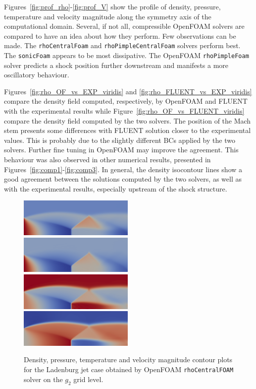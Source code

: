 \documentclass[12pt]{article}
\begin{document}
Figures~\ref{fig:prof_rho}-\ref{fig:prof_V} show the profile of density, pressure, temperature and velocity magnitude along the symmetry axis of the computational domain. 
Several, if not all, compressible OpenFOAM solvers are compared to have an idea about how they perform. Few observations can be made. The \texttt{rhoCentralFoam} and \texttt{rhoPimpleCentralFoam} solvers perform best. The \texttt{sonicFoam} appears to be most dissipative. The OpenFOAM \texttt{rhoPimpleFoam} solver predicts a shock position further downstream and manifests a more oscillatory behaviour.

Figures~\ref{fig:rho_OF_vs_EXP_viridis} and \ref{fig:rho_FLUENT_vs_EXP_viridis} compare the density field computed, respectively, by OpenFOAM and FLUENT with the experimental results while Figure~\ref{fig:rho_OF_vs_FLUENT_viridis} compare the density field computed by the two solvers. The position of the Mach stem presents some differences with FLUENT solution closer to the experimental values. This is probably due to the slightly different BCs applied by the two solvers. Further fine tuning in OpenFOAM may improve the agreement. This behaviour was also observed in other numerical results, presented in Figures~\ref{fig:comp1}-\ref{fig:comp3}. In general, the density isocontour lines show a good agreement between the solutions computed by the two solvers, as well as with the experimental results, especially upstream of the shock structure.

\begin{figure}[H]
  \centering
  \includegraphics[width=0.495\textwidth]{figs/rho.png}
  \includegraphics[width=0.495\textwidth]{figs/p.png}\\
  \includegraphics[width=0.495\textwidth]{figs/T.png}
  \includegraphics[width=0.495\textwidth]{figs/U.png}
  \caption{Density, pressure, temperature and velocity magnitude contour plots for the Ladenburg jet case obtained by OpenFOAM \texttt{rhoCentralFOAM} solver on the $g_2$ grid level.}
  \label{fig:OFplots}
\end{figure}
\end{document}
